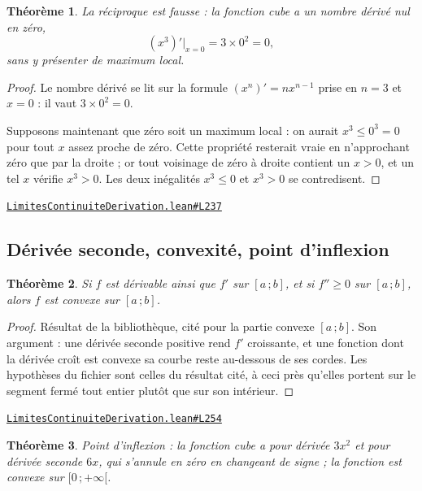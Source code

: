 \documentclass[11pt,a4paper]{article}
\theoremstyle{definition}
\theoremstyle{plain}
\newtheorem{theoreme}{Théorème}
\newcommand{\source}[2]{\par\smallskip\noindent\hfill{\footnotesize\href{#1}{\texttt{#2}}}\par\smallskip}
\begin{document}
\begin{theoreme}
La réciproque est fausse : la fonction cube a un nombre dérivé nul en zéro,
\[ (x^{3})'\big|_{x=0} = 3 \times 0^{2} = 0 , \]
sans y présenter de maximum local.
\end{theoreme}

\begin{proof}
Le nombre dérivé se lit sur la formule $(x^n)' = n x^{n-1}$ prise en $n = 3$ et $x = 0$ :
il vaut $3 \times 0^{2} = 0$.

Supposons maintenant que zéro soit un maximum local : on aurait $x^{3} \le 0^{3} = 0$ pour
tout $x$ assez proche de zéro. Cette propriété resterait vraie en n'approchant zéro que par
la droite ; or tout voisinage de zéro à droite contient un $x > 0$, et un tel $x$ vérifie
$x^{3} > 0$. Les deux inégalités $x^3 \le 0$ et $x^3 > 0$ se contredisent.
\end{proof}
\source{https://github.com/Commutator-IO/learn-lean/blob/main/cours/02-lycee/04-limites-continuite-derivation/LimitesContinuiteDerivation.lean\#L237}{LimitesContinuiteDerivation.lean\#L237}

\subsection{Dérivée seconde, convexité, point d'inflexion}

\begin{theoreme}
Si $f$ est dérivable ainsi que $f'$ sur $[a\,;b]$, et si $f'' \ge 0$ sur $[a\,;b]$, alors
$f$ est convexe sur $[a\,;b]$.
\end{theoreme}

\begin{proof}
Résultat de la bibliothèque, cité pour la partie convexe $[a\,;b]$. Son argument : une
dérivée seconde positive rend $f'$ croissante, et une fonction dont la dérivée croît est
convexe \textemdash{} sa courbe reste au-dessous de ses cordes. Les hypothèses du fichier
sont celles du résultat cité, à ceci près qu'elles portent sur le segment fermé tout entier
plutôt que sur son intérieur.
\end{proof}
\source{https://github.com/Commutator-IO/learn-lean/blob/main/cours/02-lycee/04-limites-continuite-derivation/LimitesContinuiteDerivation.lean\#L254}{LimitesContinuiteDerivation.lean\#L254}

\begin{theoreme}
Point d'inflexion : la fonction cube a pour dérivée $3x^{2}$ et pour dérivée seconde
$6x$, qui s'annule en zéro en changeant de signe ; la fonction est convexe sur
$[0\,;+\infty[$.
\end{theoreme}
\end{document}
